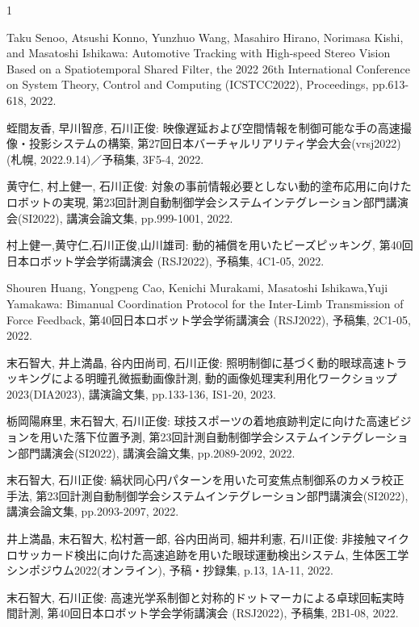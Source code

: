 \begin{発表}{1}


Taku Senoo, Atsushi Konno, Yunzhuo Wang, Masahiro Hirano, Norimasa Kishi, and Masatoshi Ishikawa: Automotive Tracking with High-speed Stereo Vision Based on a Spatiotemporal Shared Filter, the 2022 26th International Conference on System Theory, Control and Computing (ICSTCC2022), Proceedings, pp.613-618, 2022.


蛭間友香, 早川智彦, 石川正俊: 映像遅延および空間情報を制御可能な手の高速撮像・投影システムの構築, 第27回日本バーチャルリアリティ学会大会(vrsj2022)(札幌, 2022.9.14)／予稿集, 3F5-4, 2022.


黄守仁, 村上健一, 石川正俊: 対象の事前情報必要としない動的塗布応用に向けたロボットの実現, 第23回計測自動制御学会システムインテグレーション部門講演会(SI2022), 講演会論文集, pp.999-1001, 2022.

村上健一,黄守仁,石川正俊,山川雄司: 動的補償を用いたビーズピッキング, 第40回日本ロボット学会学術講演会 (RSJ2022), 予稿集, 4C1-05, 2022.

Shouren Huang, Yongpeng Cao, Kenichi Murakami, Masatoshi Ishikawa,Yuji Yamakawa: Bimanual Coordination Protocol for the Inter-Limb Transmission of Force Feedback, 第40回日本ロボット学会学術講演会 (RSJ2022), 予稿集, 2C1-05, 2022.


末石智大, 井上満晶, 谷内田尚司, 石川正俊: 照明制御に基づく動的眼球高速トラッキングによる明瞳孔微振動画像計測, 動的画像処理実利用化ワークショップ2023(DIA2023), 講演論文集, pp.133-136, IS1-20, 2023.

栃岡陽麻里, 末石智大, 石川正俊: 球技スポーツの着地痕跡判定に向けた高速ビジョンを用いた落下位置予測, 第23回計測自動制御学会システムインテグレーション部門講演会(SI2022), 講演会論文集, pp.2089-2092, 2022.

末石智大, 石川正俊: 縞状同心円パターンを用いた可変焦点制御系のカメラ校正手法, 第23回計測自動制御学会システムインテグレーション部門講演会(SI2022), 講演会論文集, pp.2093-2097, 2022.

井上満晶, 末石智大, 松村蒼一郎, 谷内田尚司, 細井利憲, 石川正俊: 非接触マイクロサッカード検出に向けた高速追跡を用いた眼球運動検出システム, 生体医工学シンポジウム2022(オンライン), 予稿・抄録集, p.13, 1A-11, 2022.

末石智大, 石川正俊: 高速光学系制御と対称的ドットマーカによる卓球回転実時間計測, 第40回日本ロボット学会学術講演会 (RSJ2022), 予稿集, 2B1-08, 2022.



\end{発表}

